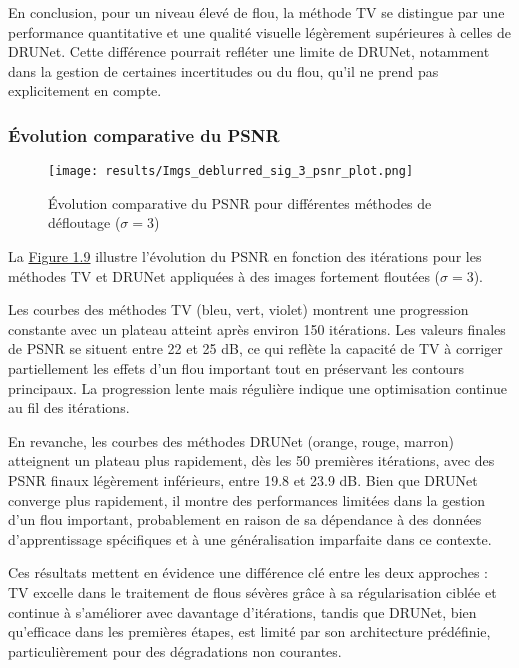 \documentclass[a4paper, 12pt]{report} %
\begin{document}
En conclusion, pour un niveau élevé de flou, la méthode TV se distingue par une performance quantitative et une qualité visuelle légèrement supérieures à celles de DRUNet. Cette différence pourrait refléter une limite de DRUNet, notamment dans la gestion de certaines incertitudes ou du flou, qu’il ne prend pas explicitement en compte.

\subsubsection{Évolution comparative du PSNR}
\begin{figure}[H]
\centering
\begin{adjustbox}{width=0.985\linewidth, totalheight=0.47 \textheight, angle=0, scale= 0.9, minipage= 4.2\linewidth, margin= 0}
    \texttt{[image: results/Imgs\_deblurred\_sig\_3\_psnr\_plot.png]}
\end{adjustbox}
    \caption{Évolution comparative du PSNR pour différentes méthodes de défloutage (\(\sigma = 3\))}
    \label{fig:9}
\end{figure} 

La \hyperref[fig:9]{Figure 1.9} illustre l'évolution du PSNR en fonction des itérations pour les méthodes TV et DRUNet appliquées à des images fortement floutées (\(\sigma = 3\)).

Les courbes des méthodes TV (bleu, vert, violet) montrent une progression constante avec un plateau atteint après environ 150 itérations. Les valeurs finales de PSNR se situent entre 22 et 25 dB, ce qui reflète la capacité de TV à corriger partiellement les effets d’un flou important tout en préservant les contours principaux. La progression lente mais régulière indique une optimisation continue au fil des itérations.

En revanche, les courbes des méthodes DRUNet (orange, rouge, marron) atteignent un plateau plus rapidement, dès les 50 premières itérations, avec des PSNR finaux légèrement inférieurs, entre 19.8 et 23.9 dB. Bien que DRUNet converge plus rapidement, il montre des performances limitées dans la gestion d’un flou important, probablement en raison de sa dépendance à des données d’apprentissage spécifiques et à une généralisation imparfaite dans ce contexte.

Ces résultats mettent en évidence une différence clé entre les deux approches : TV excelle dans le traitement de flous sévères grâce à sa régularisation ciblée et continue à s’améliorer avec davantage d’itérations, tandis que DRUNet, bien qu’efficace dans les premières étapes, est limité par son architecture prédéfinie, particulièrement pour des dégradations non courantes.
\end{document}
